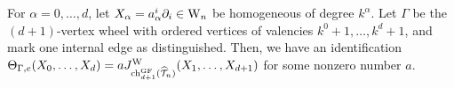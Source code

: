 %
%

\begin{lem}
For $\alpha=0,\ldots,d$, let $X_\alpha = a^i_\alpha \partial_i \in {{\rm W}_n}$ be homogeneous of degree $k^\alpha$. 
Let $\Gamma$ be the $(d+1)$-vertex wheel with ordered vertices of valencies $k^0+1, \ldots, k^{d} + 1$, and mark one internal edge as distinguished.
Then, we have an identification $\Theta_{\Gamma,e}(X_0,\ldots,X_{d}) = a J^{\rm W}_{{\rm ch}_{d+1}^{\rm GF} (\widehat{\mathcal T}_n)}(X_1,\ldots,X_{d+1})$ for some nonzero number $a$. 
\end{lem}
 

